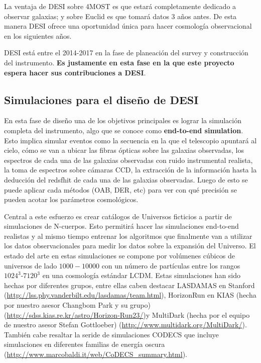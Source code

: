 La ventaja de DESI sobre 4MOST es que estar\'a completamente dedicado
a observar galaxias; y sobre Euclid es que tomar\'a datos 3 a\~nos
antes. De esta manera DESI ofrece una oportunidad \'unica para hacer
cosmolog\'ia observacional en los siguientes a\~nos. 

DESI est\'a entre el 2014-2017 en la fase de planeaci\'on del survey y
construcci\'on del instrumento. {\bf Es justamente en esta fase en la que
este proyecto espera hacer sus contribuciones a DESI}.


\subsection{Simulaciones para el dise\~no de DESI}

En esta fase de dise\~no una de los objetivos principales es lograr la
simulaci\'on completa del instrumento, algo que se conoce como {\bf
  end-to-end simulation}. Esto implica simular eventos como la
secuencia en la que el telescopio apuntar\'a al cielo, c\'omo se van a
ubicar las fibras \'opticas sobre las galaxias observadas, los
espectros de cada una de las galaxias observadas con ruido
instrumental realista, la toma de espectros sobre c\'amaras CCD, la
extracci\'on de la informaci\'on hasta la deducci\'on del redsfhit de
cada una de las galaxias observadas. Luego de esto se puede aplicar
cada m\'etodos (OAB, DER, etc) para ver con qu\'e precisi\'on se
pueden acotar los par\'ametros cosmol\'ogicos. 

Central a este esfuerzo es crear cat\'alogos de Universos ficticios a
partir de simulaciones de N-cuerpos. Esto permitir\'a hacer las
simulaciones end-to-end realistas y al mismo tiempo entrenar los
algoritmos que finalmente van a utilizar los datos observacionales
para medir los datos sobre la expansi\'on del Universo. El estado del
arte en estas simulaciones se compone por vol\'umenes c\'ubicos de
universos  de lado $1000-10000$\hMpc
con un n\'umero de part\'iculas entre los rangos
$1024^3$-$7120^3$ en una cosmolog\'ia est\'andar LCDM. Estas
simulaciones han sido hechas por diferentes grupos, entre ellas caben
destacar LASDAMAS en Stanford
(\url{http://lss.phy.vanderbilt.edu/lasdamas/team.html}), HorizonRun en KIAS (hecha por nuestro asesor Changbom Park y su grupo)
(\url{http://sdss.kias.re.kr/astro/Horizon-Run23/})y MultiDark (hecha
por el equipo de nuestro asesor Stefan Gottloeber)
(\url{http://www.multidark.org/MultiDark/}). Tambi\'en cabe resaltar
la seride de simulaciones CODECS que incluye simulaciones en
diferentes familias de energ\'ia oscura
(\url{http://www.marcobaldi.it/web/CoDECS_summary.html}). 












